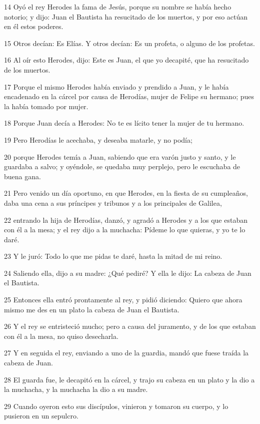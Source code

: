 \par 14 Oyó el rey Herodes la fama de Jesús, porque su nombre se había hecho notorio; y dijo: Juan el Bautista ha resucitado de los muertos, y por eso actúan en él estos poderes.
\par 15 Otros decían: Es Elías. Y otros decían: Es un profeta, o alguno de los profetas.
\par 16 Al oír esto Herodes, dijo: Este es Juan, el que yo decapité, que ha resucitado de los muertos.
\par 17 Porque el mismo Herodes había enviado y prendido a Juan, y le había encadenado en la cárcel por causa de Herodías, mujer de Felipe su hermano; pues la había tomado por mujer.
\par 18 Porque Juan decía a Herodes: No te es lícito tener la mujer de tu hermano.
\par 19 Pero Herodías le acechaba, y deseaba matarle, y no podía;
\par 20 porque Herodes temía a Juan, sabiendo que era varón justo y santo, y le guardaba a salvo; y oyéndole, se quedaba muy perplejo, pero le escuchaba de buena gana.
\par 21 Pero venido un día oportuno, en que Herodes, en la fiesta de su cumpleaños, daba una cena a sus príncipes y tribunos y a los principales de Galilea,
\par 22 entrando la hija de Herodías, danzó, y agradó a Herodes y a los que estaban con él a la mesa; y el rey dijo a la muchacha: Pídeme lo que quieras, y yo te lo daré.
\par 23 Y le juró: Todo lo que me pidas te daré, hasta la mitad de mi reino.
\par 24 Saliendo ella, dijo a su madre: ¿Qué pediré? Y ella le dijo: La cabeza de Juan el Bautista.
\par 25 Entonces ella entró prontamente al rey, y pidió diciendo: Quiero que ahora mismo me des en un plato la cabeza de Juan el Bautista.
\par 26 Y el rey se entristeció mucho; pero a causa del juramento, y de los que estaban con él a la mesa, no quiso desecharla.
\par 27 Y en seguida el rey, enviando a uno de la guardia, mandó que fuese traída la cabeza de Juan.
\par 28 El guarda fue, le decapitó en la cárcel, y trajo su cabeza en un plato y la dio a la muchacha, y la muchacha la dio a su madre.
\par 29 Cuando oyeron esto sus discípulos, vinieron y tomaron su cuerpo, y lo pusieron en un sepulcro.

